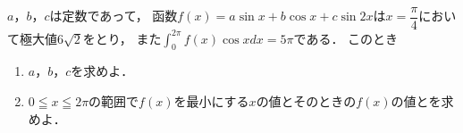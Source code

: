 \documentclass[../../main.tex]{subfiles}
\begin{document}
$a$，$b$，$c$は定数であって，
函数$f(x)=a\sin x+b\cos x+c\sin 2x$は$\displaystyle x=\dfrac{\pi}{4}$において極大値$6\sqrt2$をとり，
また$\displaystyle\int_0^{2\pi}f(x)\cos xdx=5\pi$である．
このとき
\begin{enumerate}
  \item $a$，$b$，$c$を求めよ．
  \item $0 \leqq x \leqq 2\pi$の範囲で$f(x)$を最小にする$x$の値とそのときの$f(x)$の値とを求めよ．
\end{enumerate}
\end{document}
